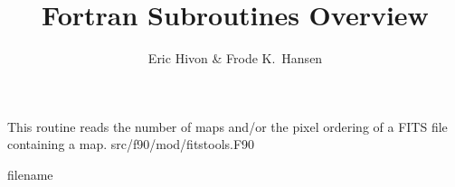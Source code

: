 
\sloppy


\title{\healpix Fortran Subroutines Overview}
 \section[getsize\_fits]{ }
\label{sub:getsize_fits}
\author{Eric Hivon \& Frode K.~Hansen}

\begin{facility}
{This routine reads the number of maps and/or the pixel ordering of a FITS file containing a \healpix map.}
{src/f90/mod/fitstools.F90}
\end{facility}

\begin{f90function}
{filename }
\end{f90function}
\aboutoptional

